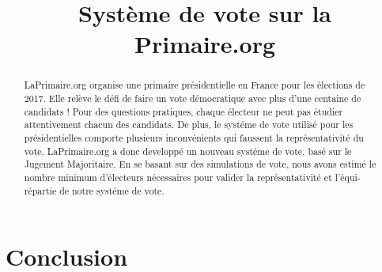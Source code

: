 \documentclass[conference]{IEEEtran}
\title{Syst\`eme de vote sur la Primaire.org}
\author{
    \IEEEauthorblockN{Pierre-Louis Guhur, Thibauld Favre}
}
\newcommand*{\rootPath}{./}
\begin{document}
  
  
\maketitle


\begin{abstract} %
LaPrimaire.org organise une primaire pr\'esidentielle en France pour les \'elections de 2017. Elle rel\`eve le d\'efi de faire un vote d\'emocratique avec plus d'une centaine de candidats ! Pour des questions pratiques, chaque \'electeur ne peut pas \'etudier attentivement chacun des candidats. De plus, le syst\'eme de vote utilis\'e pour les pr\'esidentielles comporte plusieurs inconv\'enients qui faussent la repr\'esentativit\'e du vote. LaPrimaire.org a donc developp\'e un nouveau syst\'eme de vote, bas\'e sur le Jugement Majoritaire. 
En se basant sur des simulations de vote, nous avons estim\'e le nombre minimum d'\'electeurs n\'ecessaires pour valider la repr\'esentativit\'e et l'\'equi-r\'epartie de  notre syst\'eme de vote. 
\end{abstract}











\section{Conclusion}





\ifstandalone
	
	
\fi
\end{document}
